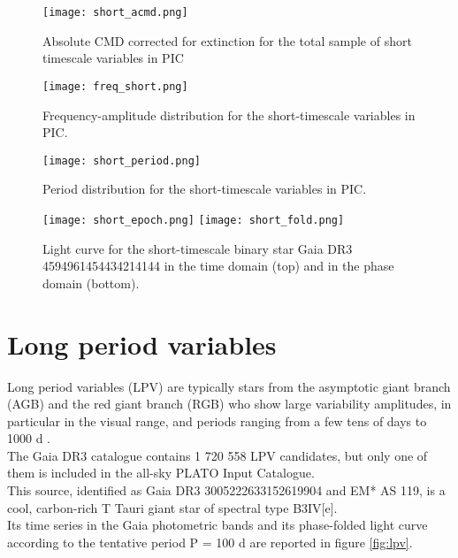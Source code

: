 \begin{figure}[H]
\centering
\texttt{[image: short\_acmd.png]}
\caption{Absolute CMD corrected for extinction for the total sample of short timescale variables in PIC}
\label{fig:short_acmd}
\end{figure}


\begin{figure}[H]
\centering
\texttt{[image: freq\_short.png]}
\caption{Frequency-amplitude distribution for the short-timescale variables in PIC.}
\label{fig:freq_short}
\end{figure}


\begin{figure}[H]
\centering
\texttt{[image: short\_period.png]}
\caption{Period distribution for the short-timescale variables in PIC.}
\label{fig:short_period}
\end{figure}



\begin{figure}[H]
\centering
\texttt{[image: short\_epoch.png]}
\texttt{[image: short\_fold.png]}
\caption{Light curve for the short-timescale binary star Gaia DR3 4594961454434214144 in the time domain (top) and in the phase domain (bottom).}
\label{fig:short_time}
\end{figure}



\newpage

\section{Long period variables}


Long period variables (LPV) are typically stars from the asymptotic giant branch (AGB) and the red giant branch (RGB) who show large variability amplitudes, in particular in the visual range, and periods ranging from a few tens of days to 1000 d \parencite{refId9}.\\
The Gaia DR3 catalogue contains 1 720 558 LPV candidates, but only one of them is included in the all-sky PLATO Input Catalogue.\\
This source, identified as Gaia DR3 3005222633152619904 and EM* AS 119, is a cool, carbon-rich T Tauri giant star of spectral type B3IV[e].\\
Its time series in the Gaia photometric bands and its phase-folded light curve according to the tentative period P = 100 d are reported in figure \ref{fig:lpv}.

